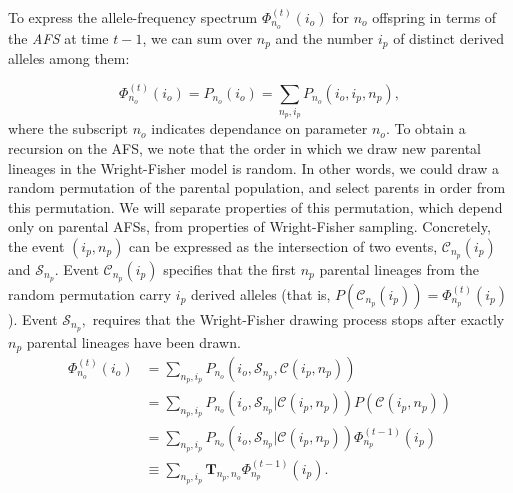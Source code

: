 \documentclass[review]{elsarticle}
\newcommand{\afs}[2]{\Phi_{#1}^{(#2)}}
\begin{document}
To express the allele-frequency spectrum $\afs{n_o}{t}(i_o)$ for $n_o$ offspring in terms of the
\textit{AFS} at time $t-1$, we can sum over $n_p$ and the number $i_p$ of distinct derived alleles among them:


\begin{equation}
\afs{n_o}{t}(i_o)=P_{n_o} (i_o) =\sum_{n_p,i_p} P_{n_o}(i_o,i_p,n_p),
\end{equation}
where the subscript $n_o$ indicates dependance on parameter $n_o$.
To obtain a recursion on the AFS, we note that the order in which we draw new parental lineages in the Wright-Fisher model is random. 
In other words, we could draw a random permutation of the parental population, and select 
parents in order from this permutation. We will separate properties of this permutation, which depend only on parental AFSs, 
from properties of Wright-Fisher sampling.  
Concretely, the event $(i_p,n_p)$  can be expressed as the intersection of two events,  $\mathcal{C}_{n_p}(i_p)$ and $\mathcal{S}_{n_p}$. 
Event $\mathcal{C}_{n_p}(i_p)$ specifies that the first $n_p$
parental lineages from the random permutation carry $i_p$ derived alleles (that is, $P(\mathcal{C}_{n_p}(i_p)) =\afs{n_p}{t} (i_p)$). 
Event $\mathcal{S}_{n_p},$ requires that the Wright-Fisher drawing process stops after exactly $n_p$ parental lineages have been drawn.
\begin{equation}
\begin{split}
\afs{n_o}{t}(i_o)&= \sum_{n_p,i_p} P_{n_o}(i_o, \mathcal{S}_{n_p}, \mathcal{C}(i_p,n_p) )\\
&=   \sum_{n_p,i_p} P_{n_o}(i_o, \mathcal{S}_{n_p}| \mathcal{C}(i_p,n_p) ) P(\mathcal{C}(i_p,n_p))\\
&=   \sum_{n_p,i_p} P_{n_o}(i_o, \mathcal{S}_{n_p}| \mathcal{C}(i_p,n_p) )  \afs{n_p}{t-1}(i_p)\\
&\equiv  \sum_{n_p,i_p}  \mathbf{T}_{n_p,n_o}     \afs{n_p}{t-1}(i_p).
\end{split}
\label{eq:recur}
\end{equation}
\end{document}
